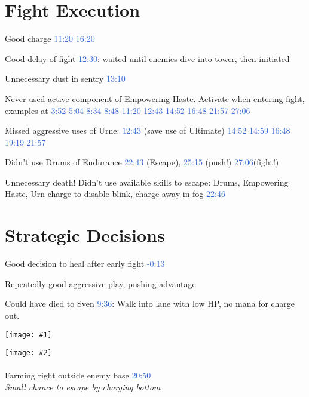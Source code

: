 \documentclass{article}
\newcommand{\gt}{\ensuremath{\;\;\color{green} \filledmedtriangleup} }
\newcommand{\rt}{\ensuremath{\;\;\color{red} \filledmedtriangledown} }
\newcommand{\ws}{\ensuremath{\;\;\color{white} \filledmedsquare} }
\newenvironment{remarks}
    {
        \begin{description}
            \setlength\itemsep{0em}
    }
    {
        \end{description}
    }
\newcommand{\goodremark}[1]{\item[\gt] #1}
\newcommand{\neutralremark}[1]{\item[\ws] #1}
\newcommand{\badremark}[1]{\item[\rt] #1}
\newcommand{\suggestion}[1]{\\ \emph{#1}}
\newcommand{\logref}[1]{\textcolor{highlight}{#1}}
\newcommand{\twoscreenshots}[2]{
\begin{center}
    \begin{minipage}[t]{0.4\textwidth}
        \begin{center}
            \texttt{[image: \#1]}
            \end{center}
    \end{minipage}
    \begin{minipage}[t]{0.4\textwidth}
            \begin{center}
        \texttt{[image: \#2]}
                \paragraph{}\hfill
            \end{center}
    \end{minipage}
\end{center}
}
\begin{document}
\section{Fight Execution}
\begin{remarks}
\goodremark{Good charge \logref{11:20} \logref{16:20}}
\goodremark{Good delay of fight \logref{12:30}: 
    waited until enemies dive into tower, then initiated}

\neutralremark{Unnecessary dust in sentry \logref{13:10}}


\badremark{Never used active component of Empowering Haste. Activate when entering fight, examples at \logref{3:52} \logref{5:04} \logref{8:34} \logref{8:48} \logref{11:20} \logref{12:43} \logref{14:52} \logref{16:48} \logref{21:57} \logref{27:06}}

\badremark{Missed aggressive uses of Urne:  \logref{12:43} (save use of Ultimate) \logref{14:52} \logref{14:59} \logref{16:48} \logref{19:19} \logref{21:57}}

\badremark{Didn't use Drums of Endurance \logref{22:43} (Escape), \logref{25:15} (push!) \logref{27:06}(fight!) }
 
\badremark{Unnecessary death! Didn't use available skills to escape: Drums, Empowering Haste, Urn charge to disable blink, charge away in fog \logref{22:46}}
    

\end{remarks}


\section{Strategic Decisions}
\begin{remarks}
\goodremark{Good decision to heal after early fight \logref{-0:13}}

\goodremark{Repeatedly good aggressive play, pushing advantage}

\badremark{Could have died to Sven \logref{9:36}: Walk into lane with low HP, no mana for charge out.
\twoscreenshots{img/929.jpg}{img/933.jpg}}

\badremark{Farming right outside enemy base \logref{20:50}
    \suggestion{Small chance to escape by charging bottom}}
\end{remarks}
\end{document}
